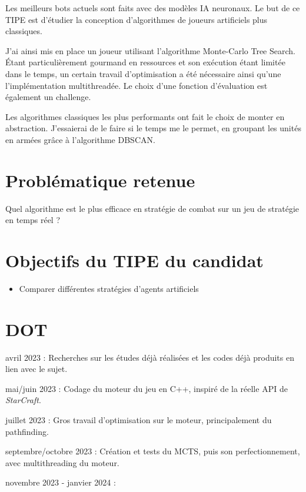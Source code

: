 \documentclass[a4paper, 12pt]{article}
\begin{document}
Les meilleurs bots actuels sont faits avec des modèles IA neuronaux.
Le but de ce TIPE est d'étudier la conception d'algorithmes de joueurs artificiels plus classiques.

J'ai ainsi mis en place un joueur utilisant l'algorithme Monte-Carlo Tree Search.
Étant particulièrement gourmand en ressources et son exécution étant limitée dans le temps,
un certain travail d'optimisation a été nécessaire ainsi qu'une l'implémentation multithreadée.
Le choix d'une fonction d'évaluation est également un challenge.\cite{MCTSRTS}\cite{MCTStactical}

Les algorithmes classiques les plus performants ont fait le choix de monter en abstraction.
J'essaierai de le faire si le temps me le permet, en groupant les unités en armées grâce à l'algorithme DBSCAN.
\cite{dbscan}\cite{combatmodel}


\section*{Problématique retenue}
Quel algorithme est le plus efficace en stratégie de combat sur un jeu de stratégie en temps réel ?

\section*{Objectifs du TIPE du candidat}
\begin{itemize}
 \item Comparer différentes stratégies d'agents artificiels
\end{itemize}





\section*{DOT}
\begin{enumerate}[label=\textbf{[\arabic*]}]
    \item avril 2023 : Recherches sur les études déjà réalisées et les codes déjà produits en lien avec le sujet.
    \item mai/juin 2023 : Codage du moteur du jeu en C++, inspiré de la réelle API de \emph{StarCraft}.
    \item juillet 2023 : Gros travail d'optimisation sur le moteur, principalement du pathfinding.
    \item septembre/octobre 2023 : Création et tests du MCTS, puis son perfectionnement, avec multithreading du moteur.
    \item novembre 2023 - janvier 2024 :
\end{enumerate}
\end{document}
